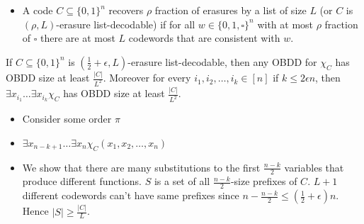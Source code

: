 {
\begin{itemize}
\item A code $C\subseteq \{0,1\}^n$ recovers $\rho$ fraction of erasures by a list of size $L$
(or $C$ is $(\rho, L)$-erasure list-decodable) if for all $w\in \{0,1,\square\}^n$ with at most $\rho$
fraction of $\square$ there are at most $L$ codewords that are consistent with $w$.
\end{itemize}

\pause
\mylem If $C\subseteq \{0,1\}^n$ is $(\frac{1}{2}+\epsilon, L)$-erasure list-decodable, then any OBDD
for $\chi_C$ has OBDD size at least $\frac{|C|}{L^2}$. Moreover for every $i_1, i_2,\dots, i_k\in [n]$ if $k\le 2\epsilon n$,
then $\exists x_{i_1}\dots \exists x_{i_k} \chi_C$ has OBDD size at least $\frac{|C|}{L^2}$.

\pause \dok
\begin{itemize}
\item Consider some order $\pi$
\item $\exists x_{n-k+1}\dots \exists x_{n} \chi_C(x_1, x_2,\dots, x_n)$
\item We show that there are many substitutions to the first $\frac{n-k}{2}$ variables that produce
different functions.
\pitem $S$ is a set of all $\frac{n-k}{2}$-size prefixes of $C$.
\pitem $L+1$ different codewords can't have same prefixes since $n-\frac{n-k}{2}\le (\frac{1}{2}+\epsilon) n$.
Hence $|S|\ge \frac{|C|}{L}$.
\end{itemize}
}

